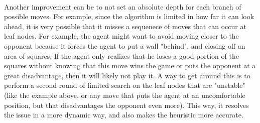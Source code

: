 \documentclass[12pt,a4paper]{article}
\begin{document}
\paragraph{} Another improvement can be to not set an absolute depth for each branch of possible moves. 
For example, since the algorithm is limited in how far it can look ahead, it is very possible that it misses 
a sequenece of moves that can occur at leaf nodes. For example, the agent might want to avoid moving closer 
to the opponent because it forces the agent to put a wall "behind", and closing off an area of squares. 
If the agent only realizes that he loses a good portion of the squares without knowing that this move  
wins the game or puts the opponent at a great disadvantage, then it will likely not play it. 
A way to get around this is to perform a second round 
of limited search on the leaf nodes that are "unstable" (like the example above, or any move that puts 
the agent at an uncomfortable position, but that disadvantages the opponent even more). This way, 
it resolves the issue in a more dynamic way, and also makes the heuristic more accurate. 
\end{document}
